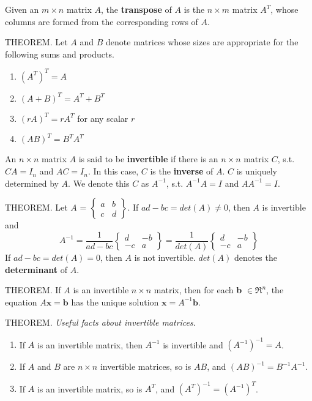 \documentclass{article}
\begin{document}
\hfill \newline Given an $m \times n$ matrix $A$, the \textbf{transpose} of $A$ is the $n \times m$ matrix $A^T$, whose columns are formed from the corresponding rows of $A$.

\hfill \newline THEOREM. Let $A$ and $B$ denote matrices whose sizes are appropriate for the following sums and products.
\begin{enumerate}
    \item $(A^T)^T=A$
    \item $(A+B)^T=A^T+B^T$
    \item $(rA)^T=rA^T$ for any scalar $r$
    \item $(AB)^T=B^TA^T$
\end{enumerate}

\hfill \newline An $n \times n$ matrix $A$ is said to be \textbf{invertible} if there is an $n \times n$ matrix $C$, s.t. $CA=I_n$ and $AC=I_n$. In this case, $C$ is the \textbf{inverse} of $A$. $C$ is uniquely determined by $A$. We denote this $C$ as $A^{-1}$, s.t. $A^{-1}A=I$ and $ AA^{-1} = I$.

\hfill \newline THEOREM. Let $A$ = 
    $\begin{Bmatrix}
    a & b \\
    c & d
 \end{Bmatrix}$. If $ad-bc = det(A) \neq 0$, then $A$ is invertible and 
 \begin{equation}
     A^{-1} = \frac{1}{ad-bc}
     \begin{Bmatrix}
    d & -b \\
    -c & a
    \end{Bmatrix} =  \frac{1}{det(A)}
    \begin{Bmatrix}
    d & -b \\
    -c & a
    \end{Bmatrix}
 \end{equation}If $ad-bc = det(A) = 0$, then $A$ is not invertible. $det(A)$ denotes the \textbf{determinant} of $A$.

 \hfill \newline THEOREM. If $A$ is an invertible $n \times n$ matrix, then for each \textbf{b} $\in \Re^n$, the equation $A\textbf{x} = \textbf{b}$ has the unique solution $\textbf{x} = A^{-1}\textbf{b}$.

 \hfill \newline THEOREM. \textit{Useful facts about invertible matrices}.
 \begin{enumerate}
     \item If $A$ is an invertible matrix, then $A^{-1}$ is invertible and $(A^{-1})^{-1}=A$.
     \item If $A$ and $B$ are $n \times n$ invertible matrices, so is $AB$, and $(AB)^{-1} = B^{-1}A^{-1}$.
     \item If $A$ is an invertible matrix, so is $A^T$, and $(A^T)^{-1} =(A^{-1})^T$.
 \end{enumerate}
\end{document}
